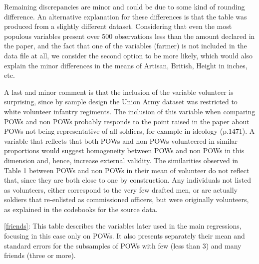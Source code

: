 \documentclass[draft.tex]{subfiles}
\begin{document}
Remaining discrepancies are minor and could be due to some kind of rounding difference. An alternative explanation for these differences is that the table was produced from a slightly different dataset. Considering that even the most populous variables present over 500 observations less than the amount declared in the paper, and the fact that one of the variables (farmer) is not included in the data file at all, we consider the second option to be more likely, which would also explain the minor differences in the means of Artisan, British, Height in inches, etc.

A last and minor comment is that the inclusion of the variable volunteer is surprising, since by sample design the Union Army dataset was restricted to white volunteer infantry regiments. The inclusion of this variable when comparing POWs and non POWs probably responds to the point raised in the paper about POWs not being representative of all soldiers, for example in ideology (p.1471). A variable that reflects that both POWs and non POWs volunteered in similar proportions would suggest homogeneity between POWs and non POWs in this dimension and, hence, increase  external validity. The similarities observed in Table 1 between POWs and non POWs in their mean of volunteer do not reflect that, since they are both close to one by construction. Any individuals not listed as volunteers, either correspond to the very few drafted men, or are actually soldiers that re-enlisted as commissioned officers, but were originally volunteers, as explained in the codebooks for the source data.

\autoref{friends}: This table describes the variables later used in the main regressions, focusing in this case only on POWs.  It also presents separately their mean and standard errors for the subsamples of POWs with few (less than 3) and many friends (three or more). 
\end{document}
